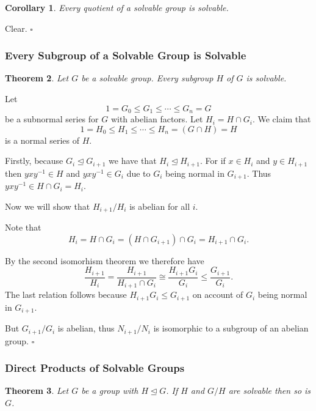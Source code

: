 \documentclass[10pt]{article}
\newtheorem{theorem}{Theorem}[section]
\newtheorem{corollary}[theorem]{Corollary}
\newenvironment{proof}[1][Proof]{\begin{trivlist}
\item[\hskip \labelsep {\itshape #1}]}{\end{trivlist}}
\begin{document}
\begin{corollary}
Every quotient of a solvable group is solvable.
\end{corollary}

\begin{proof}
Clear. $\square$
\end{proof}

\subsubsection{Every Subgroup of a Solvable Group is Solvable}

\begin{theorem}
Let $G$ be a solvable group. Every subgroup $H$ of $G$ is solvable.
\end{theorem}

\begin{proof}
Let
$$1 = G_0 \leq G_1 \leq \cdots \leq G_n = G$$
be a subnormal series for $G$ with abelian factors. Let $H_i = H\cap G_i$. We claim that
$$1 = H_0 \leq H_1 \leq \cdots \leq H_n = (G\cap H) = H$$
is a normal series of $H$.

Firstly, because $G_i \mathrel{\unlhd} G_{i+1}$ we have that $H_i \mathrel{\unlhd} H_{i+1}$. For if $x \in H_i$ and $y \in H_{i+1}$ then $yxy^{-1} \in H$ and $yxy^{-1} \in G_i$ due to $G_i$ being normal in $G_{i+1}$. Thus $yxy^{-1} \in H\cap G_i = H_i$.

Now we will show that $H_{i+1}/H_i$ is abelian for all $i$.

Note that
$$H_i = H\cap G_i = (H\cap G_{i+1})\cap G_i = H_{i+1}\cap G_i.$$

By the second isomorhism theorem we therefore have
$$\frac{H_{i+1}}{H_i} = \frac{H_{i+1}}{H_{i+1}\cap G_i} \cong \frac{H_{i+1}G_i}{G_i} \leq \frac{G_{i+1}}{G_i}.$$
The last relation follows because $H_{i+1}G_i \leq G_{i+1}$ on account of $G_i$ being normal in $G_{i+1}$.

But $G_{i+1}/G_i$ is abelian, thus $N_{i+1}/N_i$ is isomorphic to a subgroup of an abelian group. $\square$
\end{proof}

\subsubsection{Direct Products of Solvable Groups}

\begin{theorem}
Let $G$ be a group with $H \mathrel{\unlhd} G$. If $H$ and $G/H$ are solvable then so is $G$.
\end{theorem}
\end{document}
